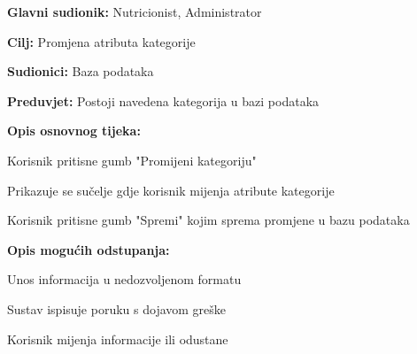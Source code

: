                     \noindent {}
                    \begin{packed_item}
    
                        \item \textbf{Glavni sudionik: }Nutricionist, Administrator
                        \item  \textbf{Cilj:} Promjena atributa kategorije
                        \item  \textbf{Sudionici:} Baza podataka
                        \item  \textbf{Preduvjet:} Postoji navedena kategorija u bazi podataka
                        \item  \textbf{Opis osnovnog tijeka:} 
                        
                        \item[] \begin{packed_enum}
    
                            \item Korisnik pritisne gumb "Promijeni kategoriju"
                            \item Prikazuje se sučelje gdje korisnik mijenja atribute kategorije
                            \item Korisnik pritisne gumb "Spremi" kojim sprema promjene u bazu podataka
                        \end{packed_enum}
                        
                        \item  \textbf{Opis mogućih odstupanja:}
                        
                        \item[] \begin{packed_item}

                            \item[2.a] Unos informacija u nedozvoljenom formatu
                            \item[] \begin{packed_enum}
                                
                                \item Sustav ispisuje poruku s dojavom greške
                                \item Korisnik mijenja informacije ili odustane
                                
                            \end{packed_enum}

                            
                        \end{packed_item}
                    \end{packed_item}


